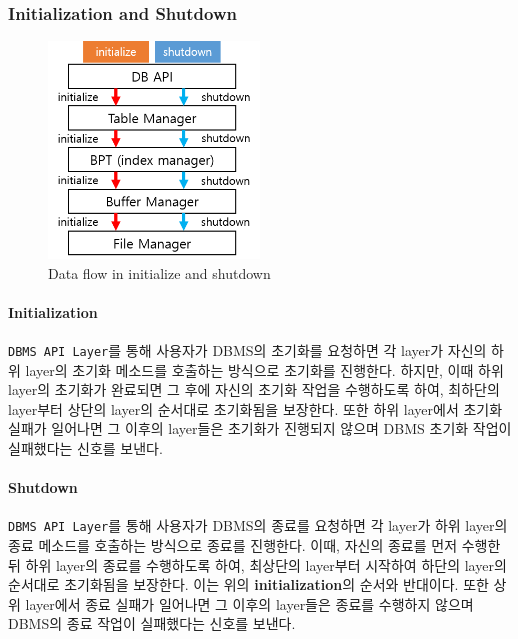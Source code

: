 \documentclass[main.tex]{subfiles}
\begin{document}
\subsubsection{Initialization and Shutdown}
\begin{figure}[h]
	\centering
	\includegraphics[width=0.5\textwidth]{images/dataflow/initialize_shutdown.png}
	\caption{Data flow in initialize and shutdown}
\end{figure}

\paragraph{Initialization} 
\texttt{DBMS API Layer}를 통해 사용자가 DBMS의 초기화를 요청하면 각 layer가 자신의 하위 layer의 초기화 메소드를 호출하는 방식으로 초기화를 진행한다.
하지만, 이때 하위 layer의 초기화가 완료되면 그 후에 자신의 초기화 작업을 수행하도록 하여, 최하단의 layer부터 상단의 layer의 순서대로 초기화됨을 보장한다.
또한 하위 layer에서 초기화 실패가 일어나면 그 이후의 layer들은 초기화가 진행되지 않으며 DBMS 초기화 작업이 실패했다는 신호를 보낸다.

\paragraph{Shutdown}
\texttt{DBMS API Layer}를 통해 사용자가 DBMS의 종료를 요청하면 각 layer가 하위 layer의 종료 메소드를 호출하는 방식으로 종료를 진행한다.
이때, 자신의 종료를 먼저 수행한 뒤 하위 layer의 종료를 수행하도록 하여, 최상단의 layer부터 시작하여 하단의 layer의 순서대로 초기화됨을 보장한다. 이는 위의 \textbf{initialization}의 순서와 반대이다.
또한 상위 layer에서 종료 실패가 일어나면 그 이후의 layer들은 종료를 수행하지 않으며 DBMS의 종료 작업이 실패했다는 신호를 보낸다.
\end{document}
